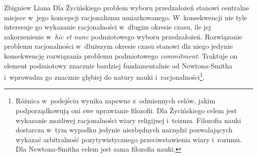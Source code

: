 \begin{artplenv}{Zbigniew Liana}
Dla Życińskiego problem wyboru przedzałożeń stanowi centralne miejsce w~jego koncepcji racjonalizmu umiarkowanego. W~konsekwencji nie tyle interesuje go wykazanie racjonalności w~długim okresie czasu, ile jej zakorzenienie w~\textit{hic et nunc} podmiotowego wyboru przedzałożeń. Rozwiązanie problemu racjonalności w~dłuższym okresie czasu stanowi dla niego jedynie konsekwencję rozwiązania problemu podmiotowego \textit{commitment}. Traktuje on element podmiotowy znacznie bardziej fundamentalnie od Newtona-Smitha i~wprowadza go znacznie głębiej do natury nauki i~racjonalności\footnote{Różnica w~podejściu wynika zapewne z~odmiennych celów, jakim podporządkowują oni swe uprawianie filozofii. Dla Życińskiego celem jest wykazanie możliwej racjonalności wiary religijnej i~teizmu. Filozofia nauki dostarcza w~tym wypadku jedynie niezbędnych narzędzi pozwalających wykazać arbitralność pozytywistycznego przeciwstawienia wiary i~rozumu. Dla Newtona-Smitha celem jest sama filozofia nauki.}.


\end{artplenv}
